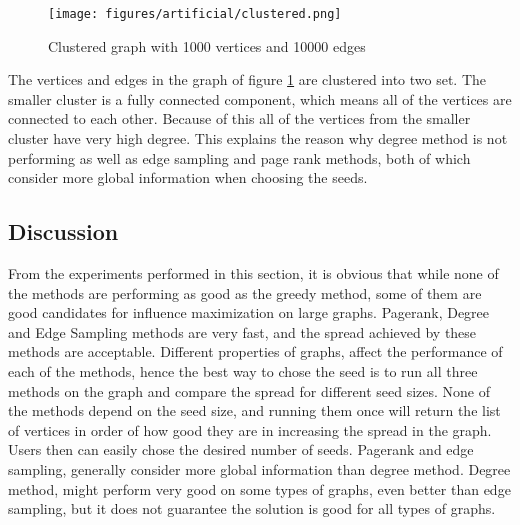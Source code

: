 \documentclass[english]{tktltiki}
\begin{document}
\begin{figure}[ht!]
\centering
\texttt{[image: figures/artificial/clustered.png]}
\caption{Clustered graph with 1000 vertices and 10000 edges}
\label{art:clustered}
\end{figure}

The vertices and edges in the graph of figure \ref{art:clustered} are clustered into two set. The smaller cluster is a fully connected component, which means all of the vertices are connected to each other. Because of this all of the vertices from the smaller cluster have very high degree. This explains the reason why degree method is not performing as well as edge sampling and page rank methods, both of which consider more global information when choosing the seeds.\\
\subsection{Discussion}
From the experiments performed in this section, it is obvious that while none of the methods are performing as good as the greedy method, some of them are good candidates for influence maximization on large graphs. Pagerank, Degree and Edge Sampling methods are very fast, and the spread achieved by these methods are acceptable. Different properties of graphs, affect the performance of each of the methods, hence the best way to chose the seed is to run all three methods on the graph and compare the spread for different seed sizes. None of the methods depend on the seed size, and running them once will return the list of vertices in order of how good they are in increasing the spread in the graph. Users then can easily chose the desired number of seeds. Pagerank and edge sampling, generally consider more global information than degree method. Degree method, might perform very good on some types of graphs, even better than edge sampling, but it does not guarantee the solution is good for all types of graphs. \\


\pagebreak
\end{document}
